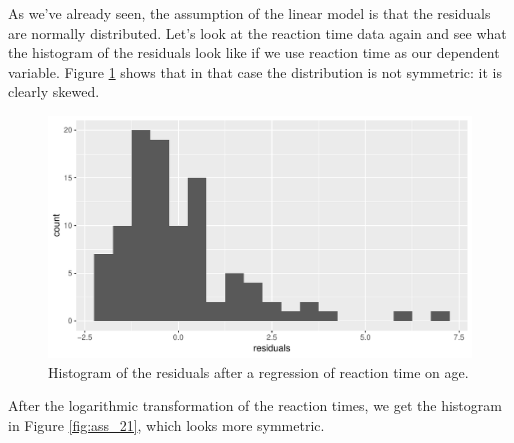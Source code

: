 \documentclass[]{report}\usepackage[]{graphicx}\usepackage[]{color}
\makeatletter
\def\maxwidth{ %
  \ifdim\Gin@nat@width>\linewidth
    \linewidth
  \else
    \Gin@nat@width
  \fi
}
\newenvironment{knitrout}{}{} %
\makeatother
\begin{document}
As we've already seen, the assumption of the linear model is that the residuals are normally distributed. Let's look at the reaction time data again and see what the histogram of the residuals look like if we use reaction time as our dependent variable. Figure \ref{fig:ass_20} shows that in that case the distribution is not symmetric: it is clearly skewed. 

\begin{knitrout}
\color{fgcolor}\begin{figure}

{\centering \includegraphics[width=\maxwidth]{figure/ass_20-1} 

}

\caption[Histogram of the residuals after a regression of reaction time on age]{Histogram of the residuals after a regression of reaction time on age.}\label{fig:ass_20}
\end{figure}


\end{knitrout}

After the logarithmic transformation of the reaction times, we get the histogram in Figure \ref{fig:ass_21}, which looks more symmetric. 
\end{document}
